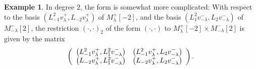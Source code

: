 \documentclass
[numbers=enddot,12pt,final,onecolumn,german,notitlepage]{scrartcl}%
\theoremstyle{definition}
\newtheorem{example}[theo]{Example}
\begin{document}
\begin{example}
In degree $2$, the form is somewhat more complicated: With respect to the
basis $\left(  L_{-1}^{2}v_{\lambda}^{+},L_{-2}v_{\lambda}^{+}\right)  $ of
$M_{\lambda}^{+}\left[  -2\right]  $, and the basis $\left(  L_{1}%
^{2}v_{-\lambda}^{-},L_{2}v_{-\lambda}^{-}\right)  $ of $M_{-\lambda}%
^{-}\left[  2\right]  $, the restriction $\left(  \cdot,\cdot\right)  _{2}$ of
the form $\left(  \cdot,\cdot\right)  $ to $M_{\lambda}^{+}\left[  -2\right]
\times M_{-\lambda}^{-}\left[  2\right]  $ is given by the matrix%
\[
\left(
\begin{array}
[c]{cc}%
\left(  L_{-1}^{2}v_{\lambda}^{+},L_{1}^{2}v_{-\lambda}^{-}\right)  & \left(
L_{-1}^{2}v_{\lambda}^{+},L_{2}v_{-\lambda}^{-}\right) \\
\left(  L_{-2}v_{\lambda}^{+},L_{1}^{2}v_{-\lambda}^{-}\right)  & \left(
L_{-2}v_{\lambda}^{+},L_{2}v_{-\lambda}^{-}\right)
\end{array}
\right)  .
\]



\end{example}
\end{document}
